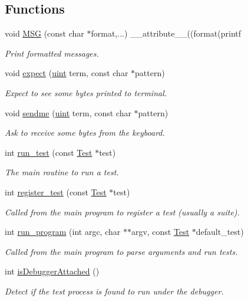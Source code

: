 \subsection*{Functions}
\begin{DoxyCompactItemize}
\item 
void \hyperlink{group__Testing_ga2e36933a48fbca44bb782f881ddceb20}{M\+SG} (const char $\ast$format,...) \+\_\+\+\_\+attribute\+\_\+\+\_\+((format(printf
\begin{DoxyCompactList}\small\item\em Print formatted messages. \end{DoxyCompactList}\item 
void \hyperlink{group__Testing_ga0c4e801b8c3317b802fa4e80e1e26de2}{expect} (\hyperlink{bios_8h_a91ad9478d81a7aaf2593e8d9c3d06a14}{uint} term, const char $\ast$pattern)
\begin{DoxyCompactList}\small\item\em Expect to see some bytes printed to terminal. \end{DoxyCompactList}\item 
void \hyperlink{group__Testing_ga0f97d30c4cd1370bcac6d7f4775d6789}{sendme} (\hyperlink{bios_8h_a91ad9478d81a7aaf2593e8d9c3d06a14}{uint} term, const char $\ast$pattern)
\begin{DoxyCompactList}\small\item\em Ask to receive some bytes from the keyboard. \end{DoxyCompactList}\item 
int \hyperlink{group__Testing_gac023795199b4f577a9181ac45e62b170}{run\+\_\+test} (const \hyperlink{structTest}{Test} $\ast$test)
\begin{DoxyCompactList}\small\item\em The main routine to run a test. \end{DoxyCompactList}\item 
int \hyperlink{group__Testing_ga4663cf3fb390b2a6d9cf1943f21b9934}{register\+\_\+test} (const \hyperlink{structTest}{Test} $\ast$test)
\begin{DoxyCompactList}\small\item\em Called from the main program to register a test (usually a suite). \end{DoxyCompactList}\item 
int \hyperlink{group__Testing_ga91dbdb97056588b088b689582abc2382}{run\+\_\+program} (int argc, char $\ast$$\ast$argv, const \hyperlink{structTest}{Test} $\ast$default\+\_\+test)
\begin{DoxyCompactList}\small\item\em Called from the main program to parse arguments and run tests. \end{DoxyCompactList}\item 
int \hyperlink{group__Testing_ga106e4293a3520dae79707bdf492dc68b}{is\+Debugger\+Attached} ()
\begin{DoxyCompactList}\small\item\em Detect if the test process is found to run under the debugger. \end{DoxyCompactList}\end{DoxyCompactItemize}
